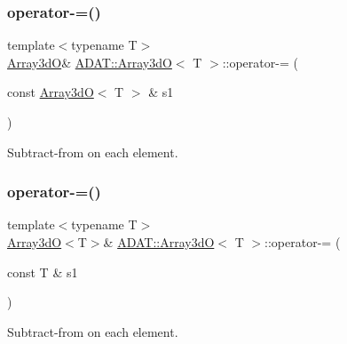 \subsubsection{\texorpdfstring{operator-\/=()}{operator-=()}\hspace{0.1cm}{\footnotesize\ttfamily [2/4]}}
{\footnotesize\ttfamily template$<$typename T$>$ \\
\mbox{\hyperlink{classADAT_1_1Array3dO}{Array3dO}}\& \mbox{\hyperlink{classADAT_1_1Array3dO}{A\+D\+A\+T\+::\+Array3dO}}$<$ T $>$\+::operator-\/= (\begin{DoxyParamCaption}\item[{const \mbox{\hyperlink{classADAT_1_1Array3dO}{Array3dO}}$<$ T $>$ \&}]{s1 }\end{DoxyParamCaption})\hspace{0.3cm}{\ttfamily [inline]}}



Subtract-\/from on each element. 

\mbox{\label{classADAT_1_1Array3dO_a0341b7ddc224910074b55646bca45e2a}} 
\subsubsection{\texorpdfstring{operator-\/=()}{operator-=()}\hspace{0.1cm}{\footnotesize\ttfamily [3/4]}}
{\footnotesize\ttfamily template$<$typename T$>$ \\
\mbox{\hyperlink{classADAT_1_1Array3dO}{Array3dO}}$<$T$>$\& \mbox{\hyperlink{classADAT_1_1Array3dO}{A\+D\+A\+T\+::\+Array3dO}}$<$ T $>$\+::operator-\/= (\begin{DoxyParamCaption}\item[{const T \&}]{s1 }\end{DoxyParamCaption})\hspace{0.3cm}{\ttfamily [inline]}}



Subtract-\/from on each element. 

\mbox{\label{classADAT_1_1Array3dO_a0341b7ddc224910074b55646bca45e2a}} 
